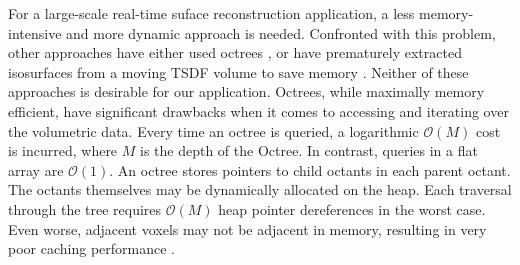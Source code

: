 \documentclass[10pt,twocolumn,letterpaper]{article}
\begin{document}
For a large-scale real-time suface reconstruction application, a less
memory-intensive and more dynamic approach is needed. Confronted with this
problem, other approaches have either used  octrees \cite{Wurm2010}, or have
prematurely extracted isosurfaces from a moving TSDF volume to save memory 
\cite{Whelan2013}. Neither of these approaches is desirable for our application.
Octrees, while maximally memory efficient, have significant drawbacks when it comes to
accessing and iterating over the volumetric data. Every time an octree is
queried,  a logarithmic $\mathcal{O}(M)$ cost is incurred, where $M$ is the depth of the
Octree. In contrast, queries in a flat array are $\mathcal{O}(1)$. An octree
stores pointers to child octants in each parent octant. The octants themselves
may be dynamically allocated on the heap. Each traversal through the tree
requires $\mathcal{O}(M)$ heap pointer dereferences in the worst case.
Even worse, adjacent voxels may not be adjacent in memory, resulting in very
poor caching performance \cite{CacheStructures}. 
\end{document}
